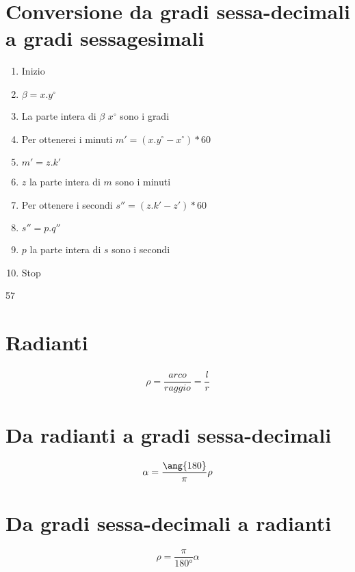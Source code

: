 \section{Conversione da gradi sessa-decimali  a gradi sessagesimali}
\begin{enumerate}
	\item Inizio
	\item $\beta=x.y^\circ$
	\item La parte intera di $\beta$ $x^\circ$ sono i gradi
	\item Per ottenerei i minuti $m'=(x.y^\circ-x^\circ)*60$
	\item $m'=z.k'$
	\item $z$ la parte intera di $m$ sono i minuti 
	\item Per ottenere i secondi
	$s''=(z.k'-z')*60$ 
	\item $s''=p.q''$
	\item $p$ la parte intera di $s$ sono i secondi
	\item Stop
\end{enumerate}
57\section{Radianti}
\begin{center}
	
\end{center}
\begin{align*}
\rho=\dfrac{arco}{raggio}=\dfrac{l}{r}
\end{align*}
\section{Da radianti a gradi sessa-decimali}
\begin{equation*}\index{Angoli!conversione!radianti gradi}
\alpha=\dfrac{\ang{180}}{\pi}\rho
\end{equation*}
\section{Da gradi sessa-decimali a radianti}
\begin{equation*}
\rho=\dfrac{\pi}{\ang{180}}\alpha
\end{equation*}
